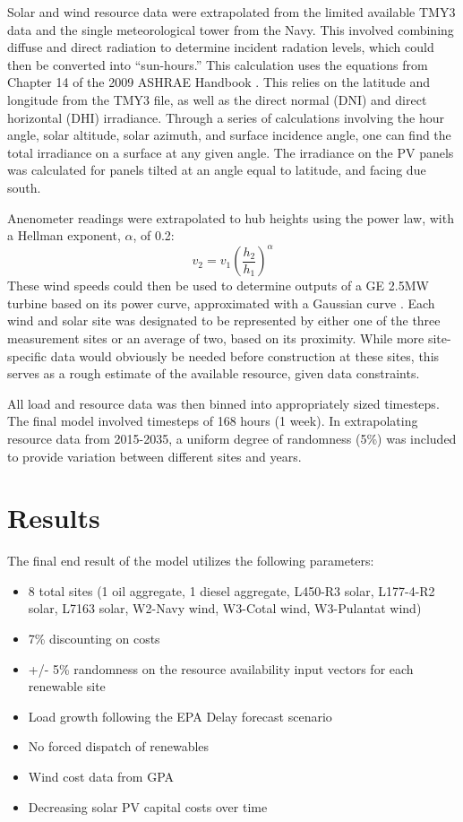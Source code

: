 \documentclass[12pt,letterpaper,fleqn]{article}
\begin{document}
Solar and wind resource data were extrapolated from the limited
available TMY3 data and the single meteorological tower from the
Navy. This involved combining diffuse and direct radiation to
determine incident radation levels, which could then be converted into
``sun-hours.'' This calculation uses the equations from Chapter 14 of
the 2009 ASHRAE Handbook \cite{ashrae}. This relies on the latitude
and longitude from the TMY3 file, as well as the direct normal (DNI)
and direct horizontal (DHI) irradiance. Through a series of
calculations involving the hour angle, solar altitude, solar azimuth,
and surface incidence angle, one can find the total irradiance on a
surface at any given angle. The irradiance on the PV panels was
calculated for panels tilted at an angle equal to latitude, and facing
due south.

Anenometer readings were extrapolated to hub heights
using the power law, with a Hellman exponent, $\alpha$, of 0.2:
\[v_2 = v_1\left(\frac{h_2}{h_1}\right)^\alpha\] 
These wind speeds could then be used to determine outputs of a GE
2.5MW turbine based on its power curve, approximated with a Gaussian
curve \cite{ge}. Each wind and solar site was designated to be
represented by either one of the three measurement sites or an average
of two, based on its proximity. While more site-specific data would
obviously be needed before construction at these sites, this serves as
a rough estimate of the available resource, given data constraints.

All load and resource data was then binned into appropriately sized
timesteps. The final model involved timesteps of 168 hours (1
week). In extrapolating resource data from 2015-2035, a uniform
degree of randomness (5\%) was included to provide variation between
different sites and years. 

\section{Results}

The final end result of the model utilizes the following parameters:
\begin{itemize}
\item 8 total sites (1 oil aggregate, 1 diesel aggregate, L450-R3
  solar, L177-4-R2 solar, L7163 solar, W2-Navy wind, W3-Cotal wind,
  W3-Pulantat wind)
\item 7\% discounting on costs
\item +/- 5\% randomness on the resource availability input vectors
  for each renewable site
\item Load growth following the EPA Delay forecast scenario
\item No forced dispatch of renewables
\item Wind cost data from GPA
\item Decreasing solar PV capital costs over time
\end{itemize}
\end{document}
